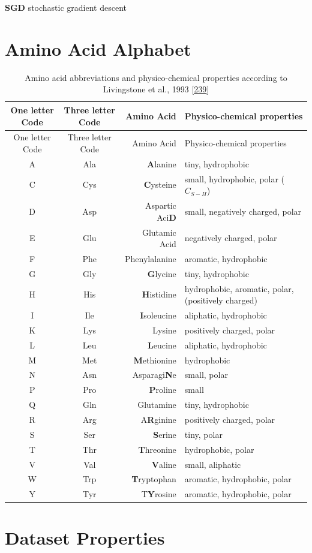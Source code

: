 \documentclass[11pt,a4paper,twoside]{book}
\newcommand{\blandscape}{\begin{landscape}}
\newcommand{\elandscape}{\end{landscape}}
\theoremstyle{definition}
\theoremstyle{definition}
\theoremstyle{remark}
\begin{document}
\textbf{SGD} stochastic gradient descent

\chapter{Amino Acid Alphabet}\label{amino-acids}

\blandscape

\begin{longtable}[]{@{}ccrl@{}}
\caption{\label{tab:amino-acid-prop} Amino acid abbreviations and
physico-chemical properties according to Livingstone et al., 1993
{[}\protect\hyperlink{ref-Livingstone1993}{239}{]}}\tabularnewline
\toprule
One letter Code & Three letter Code & Amino Acid & Physico-chemical
properties\tabularnewline
\midrule
\endfirsthead
\toprule
One letter Code & Three letter Code & Amino Acid & Physico-chemical
properties\tabularnewline
\midrule
\endhead
A & Ala & \textbf{A}lanine & tiny, hydrophobic\tabularnewline
C & Cys & \textbf{C}ysteine & small, hydrophobic, polar
(\(C_{S-H}\))\tabularnewline
D & Asp & Aspartic Aci\textbf{D} & small, negatively charged,
polar\tabularnewline
E & Glu & Glutamic Acid & negatively charged, polar\tabularnewline
F & Phe & Phenylalanine & aromatic, hydrophobic\tabularnewline
G & Gly & \textbf{G}lycine & tiny, hydrophobic\tabularnewline
H & His & \textbf{H}istidine & hydrophobic, aromatic, polar, (positively
charged)\tabularnewline
I & Ile & \textbf{I}soleucine & aliphatic, hydrophobic\tabularnewline
K & Lys & Lysine & positively charged, polar\tabularnewline
L & Leu & \textbf{L}eucine & aliphatic, hydrophobic\tabularnewline
M & Met & \textbf{M}ethionine & hydrophobic\tabularnewline
N & Asn & Asparagi\textbf{N}e & small, polar\tabularnewline
P & Pro & \textbf{P}roline & small\tabularnewline
Q & Gln & Glutamine & tiny, hydrophobic\tabularnewline
R & Arg & A\textbf{R}ginine & positively charged, polar\tabularnewline
S & Ser & \textbf{S}erine & tiny, polar\tabularnewline
T & Thr & \textbf{T}hreonine & hydrophobic, polar\tabularnewline
V & Val & \textbf{V}aline & small, aliphatic\tabularnewline
W & Trp & \textbf{T}ryptophan & aromatic, hydrophobic,
polar\tabularnewline
Y & Tyr & T\textbf{Y}rosine & aromatic, hydrophobic,
polar\tabularnewline
\bottomrule
\end{longtable}

\elandscape

\chapter{Dataset Properties}\label{dataset-properties}
\end{document}
